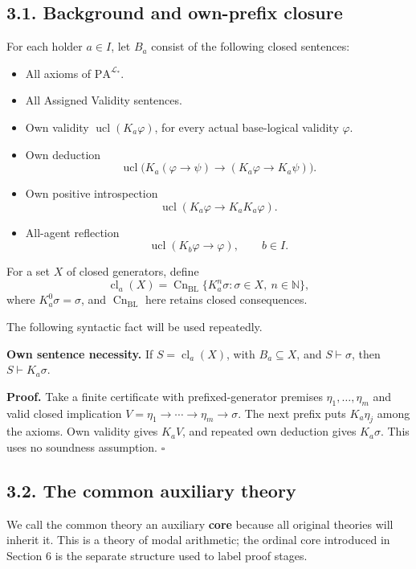 \documentclass[
  11pt,
  letterpaper,
]{article}
\providecommand{\tightlist}{%
  \setlength{\itemsep}{0pt}\setlength{\parskip}{0pt}}
\begin{document}
\subsection{3.1. Background and own-prefix
closure}\label{background-and-own-prefix-closure}

For each holder \(a\in I\), let \(B_a\) consist of the following closed
sentences:

\begin{itemize}
\tightlist
\item
  All axioms of \(\mathrm{PA}^{\mathcal L_*}\).
\item
  All Assigned Validity sentences.
\item
  Own validity \(\operatorname{ucl}(K_a\varphi)\), for every actual
  base-logical validity \(\varphi\).
\item
  Own deduction \[
  \operatorname{ucl}\bigl(K_a(\varphi\to\psi)
       \to(K_a\varphi\to K_a\psi)\bigr).
  \]
\item
  Own positive introspection \[
  \operatorname{ucl}(K_a\varphi\to K_aK_a\varphi).
  \]
\item
  All-agent reflection \[
  \operatorname{ucl}(K_b\varphi\to\varphi),\qquad b\in I.
  \]
\end{itemize}

For a set \(X\) of closed generators, define \[
\operatorname{cl}_a(X)=
\operatorname{Cn}_{\mathrm{BL}}
 \{K_a^n\sigma:\sigma\in X,\ n\in\mathbb N\},
\tag{S1}
\] where \(K_a^0\sigma=\sigma\), and \(\operatorname{Cn}_{\mathrm{BL}}\)
here retains closed consequences.

The following syntactic fact will be used repeatedly.

\textbf{Own sentence necessity.} If \(S=\operatorname{cl}_a(X)\), with
\(B_a\subseteq X\), and \(S\vdash\sigma\), then \(S\vdash K_a\sigma\).

\textbf{Proof.} Take a finite certificate with prefixed-generator
premises \(\eta_1,\ldots,\eta_m\) and valid closed implication
\(V=\eta_1\to\cdots\to\eta_m\to\sigma\). The next prefix puts
\(K_a\eta_j\) among the axioms. Own validity gives \(K_aV\), and
repeated own deduction gives \(K_a\sigma\). This uses no soundness
assumption. \(\square\)

\subsection{3.2. The common auxiliary
theory}\label{the-common-auxiliary-theory}

We call the common theory an auxiliary \textbf{core} because all
original theories will inherit it. This is a theory of modal arithmetic;
the ordinal core introduced in Section 6 is the separate structure used
to label proof stages.
\end{document}
